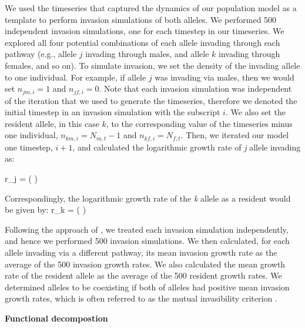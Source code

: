 \documentclass[12pt]{article}
\let\oldequation\equation
\let\oldendequation\endequation
\renewenvironment{equation}
  {\linenomathNonumbers\oldequation}
  {\oldendequation\endlinenomath}
\begin{document}
We used the timeseries that captured the dynamics of our population model as a template to perform invasion simulations of both alleles. We performed 500 independent invasion simulations, one for each timestep in our timeseries. We explored all four potential combinations of each allele invading through each pathway (e.g., allele $j$ invading through males, and allele $k$ invading through females, and so on). To simulate invasion, we set the density of the invading allele to one individual. For example, if allele $j$ was invading via males, then we would set $n_{jm,i} = 1$ and $n_{jf,i}= 0$. Note that each invasion simulation was independent of the iteration that we used to generate the timeseries, therefore we denoted the initial timestep in an invasion simulation with the subscript $i$. We also set the resident allele, in this case $k$, to the corresponding value of the timeseries minus one individual, $n_{km,i} = N_{m,t} -1$ and $n_{kf,i} = N_{f,t}$. Then, we iterated our model one timestep, $i+1$, and calculated the logarithmic growth rate of \textit{j} allele invading as:


\begin{equation}
r_{j} =	\ln \left (  \right )
\label{invader}
\end{equation}

Correspondingly, the logarithmic growth rate of the \textit{k} allele as a resident would be given by:
\begin{equation}
r_{k} =	\ln \left (  \right )
\label{resident}
\end{equation}

Following the approach of \citet{shoemaker2020}, we treated each invasion simulation independently, and hence we performed 500 invasion simulations. We then calculated, for each allele invading via a different pathway, its mean invasion growth rate as the average of the 500 invasion growth rates. We also calculated the mean growth rate of the resident allele as the average of the 500 resident growth rates. We determined alleles to be coexisting if both of alleles had positive mean invasion growth rates, which is often referred to as the mutual invasibility criterion \citep{barabas_chessons_2018}.

\vspace{5mm}
\noindent\textbf{Functional decompostion}
\end{document}
